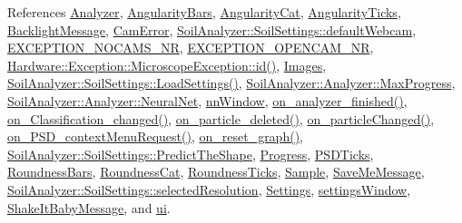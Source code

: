 References \hyperlink{vsamainwindow_8h_source_l00083}{Analyzer}, \hyperlink{vsamainwindow_8h_source_l00086}{Angularity\+Bars}, \hyperlink{vsamainwindow_8h_source_l00092}{Angularity\+Cat}, \hyperlink{vsamainwindow_8h_source_l00094}{Angularity\+Ticks}, \hyperlink{vsamainwindow_8h_source_l00076}{Backlight\+Message}, \hyperlink{vsamainwindow_8h_source_l00074}{Cam\+Error}, \hyperlink{soilsettings_8h_source_l00074}{Soil\+Analyzer\+::\+Soil\+Settings\+::default\+Webcam}, \hyperlink{_microscope_not_found_exception_8h_source_l00010}{E\+X\+C\+E\+P\+T\+I\+O\+N\+\_\+\+N\+O\+C\+A\+M\+S\+\_\+\+N\+R}, \hyperlink{_microscope_not_found_exception_8h_source_l00008}{E\+X\+C\+E\+P\+T\+I\+O\+N\+\_\+\+O\+P\+E\+N\+C\+A\+M\+\_\+\+N\+R}, \hyperlink{_microscope_not_found_exception_8h_source_l00041}{Hardware\+::\+Exception\+::\+Microscope\+Exception\+::id()}, \hyperlink{vsamainwindow_8h_source_l00084}{Images}, \hyperlink{soilsettings_8cpp_source_l00013}{Soil\+Analyzer\+::\+Soil\+Settings\+::\+Load\+Settings()}, \hyperlink{analyzer_8h_source_l00057}{Soil\+Analyzer\+::\+Analyzer\+::\+Max\+Progress}, \hyperlink{analyzer_8h_source_l00059}{Soil\+Analyzer\+::\+Analyzer\+::\+Neural\+Net}, \hyperlink{vsamainwindow_8h_source_l00072}{nn\+Window}, \hyperlink{vsamainwindow_8cpp_source_l00275}{on\+\_\+analyzer\+\_\+finished()}, \hyperlink{vsamainwindow_8cpp_source_l00522}{on\+\_\+\+Classification\+\_\+changed()}, \hyperlink{vsamainwindow_8cpp_source_l00539}{on\+\_\+particle\+\_\+deleted()}, \hyperlink{vsamainwindow_8cpp_source_l00351}{on\+\_\+particle\+Changed()}, \hyperlink{vsamainwindow_8cpp_source_l00561}{on\+\_\+\+P\+S\+D\+\_\+context\+Menu\+Request()}, \hyperlink{vsamainwindow_8cpp_source_l00545}{on\+\_\+reset\+\_\+graph()}, \hyperlink{soilsettings_8h_source_l00104}{Soil\+Analyzer\+::\+Soil\+Settings\+::\+Predict\+The\+Shape}, \hyperlink{vsamainwindow_8h_source_l00073}{Progress}, \hyperlink{vsamainwindow_8h_source_l00087}{P\+S\+D\+Ticks}, \hyperlink{vsamainwindow_8h_source_l00085}{Roundness\+Bars}, \hyperlink{vsamainwindow_8h_source_l00090}{Roundness\+Cat}, \hyperlink{vsamainwindow_8h_source_l00091}{Roundness\+Ticks}, \hyperlink{vsamainwindow_8h_source_l00082}{Sample}, \hyperlink{vsamainwindow_8h_source_l00075}{Save\+Me\+Message}, \hyperlink{soilsettings_8h_source_l00097}{Soil\+Analyzer\+::\+Soil\+Settings\+::selected\+Resolution}, \hyperlink{vsamainwindow_8h_source_l00080}{Settings}, \hyperlink{vsamainwindow_8h_source_l00071}{settings\+Window}, \hyperlink{vsamainwindow_8h_source_l00077}{Shake\+It\+Baby\+Message}, and \hyperlink{vsamainwindow_8h_source_l00070}{ui}.



